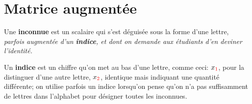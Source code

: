 \section{Matrice augmentée}

\begin{NotDef}
Une \textbf{inconnue} est un scalaire qui s'est déguisée sous
la forme d'une lettre, \textit{parfois augmentée d'un \textbf{indice}, et
dont on demande aux étudiants d'en deviner l'identité.}

Un \textbf{indice} est un chiffre qu'on met au bas d'une lettre, comme
ceci: $x_{\color{red} 1}$,
pour la distinguer d'une autre lettre, $x_{\color{red} 2}$, identique mais indiquant une quantité différente; on utilise
parfois un indice lorsqu'on pense qu'on n'a pas
suffisamment de lettres dans l'alphabet pour
désigner toutes les inconnues.
\end{NotDef}

